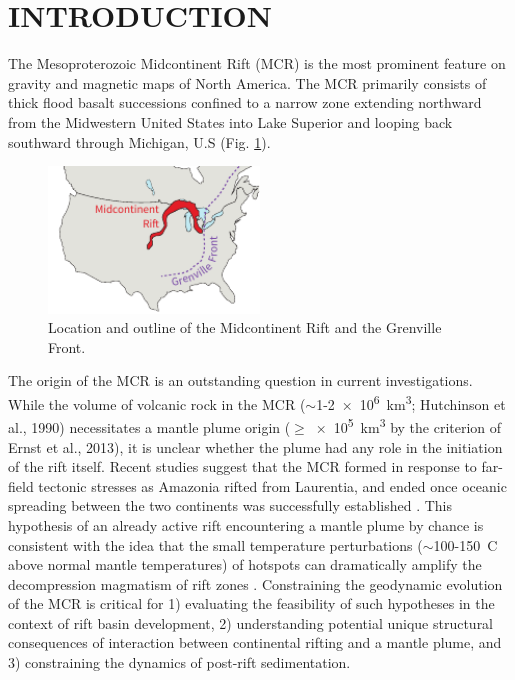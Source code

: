 \documentclass[12pt,letterpaper]{article}
\begin{document}
\section{INTRODUCTION}
The Mesoproterozoic Midcontinent Rift (MCR) is the most prominent feature on gravity and magnetic maps of North America. The MCR primarily consists of thick flood basalt successions confined to a narrow zone extending northward from the Midwestern United States into Lake Superior and looping back southward through Michigan, U.S (Fig. \ref{fig:MCR_fig}). 
\begin{figure}
\noindent\includegraphics[width=0.5\textwidth]{figures/MCR_fig.pdf}
\caption{\footnotesize{Location and outline of the Midcontinent Rift and the Grenville Front.}}
\label{fig:MCR_fig}
\end{figure}
The origin of the MCR is an outstanding question in current investigations. While the volume of volcanic rock in the MCR ($\sim$1-\SI{2e6}{km^3}; Hutchinson et al., 1990\nocite{Hutchinson1990a}) necessitates a mantle plume origin ($\geq$\SI{e5}{km^3} by the criterion of Ernst et al., 2013\nocite{Ernst2013b}), it is unclear whether the plume had any role in the initiation of the rift itself. Recent studies suggest that the MCR formed in response to far-field tectonic stresses as Amazonia rifted from Laurentia, and ended once oceanic spreading between the two continents was successfully established \citep{Stein2014a}. This hypothesis of an already active rift encountering a mantle plume by chance is consistent with the idea that the small temperature perturbations ($\sim$100-150\textdegree\ C above normal mantle temperatures) of hotspots can dramatically amplify the decompression magmatism of rift zones \citep{White1989a}. Constraining the geodynamic evolution of the MCR is critical for 1) evaluating the feasibility of such hypotheses in the context of rift basin development, 2) understanding potential unique structural consequences of interaction between continental rifting and a mantle plume, and 3) constraining the dynamics of post-rift sedimentation.\par
\end{document}
